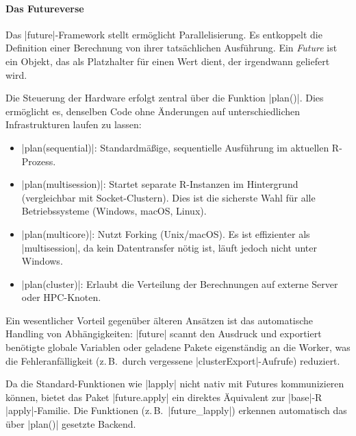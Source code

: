 \documentclass[10pt,twocolumn]{scrartcl}
\renewcommand{\lstinline}{\mycoloredinline}
\begin{document}
\paragraph{Das Futureverse}

Das \lstinline|future|-Framework stellt ermöglicht Parallelisierung. Es entkoppelt die Definition einer Berechnung von ihrer tatsächlichen Ausführung. Ein \emph{Future} ist ein Objekt, das als Platzhalter für einen Wert dient, der irgendwann geliefert wird.

Die Steuerung der Hardware erfolgt zentral über die Funktion \lstinline|plan()|. Dies ermöglicht es, denselben Code ohne Änderungen auf unterschiedlichen Infrastrukturen laufen zu lassen:

\begin{itemize}
\item \lstinline|plan(sequential)|: Standardmäßige, sequentielle Ausführung im aktuellen R-Prozess.
\item \lstinline|plan(multisession)|: Startet separate R-Instanzen im Hintergrund (vergleichbar mit Socket-Clustern). Dies ist die sicherste Wahl für alle Betriebssysteme (Windows, macOS, Linux).
\item \lstinline|plan(multicore)|: Nutzt Forking (Unix/macOS). Es ist effizienter als \lstinline|multisession|, da kein Datentransfer nötig ist, läuft jedoch nicht unter Windows.
\item \lstinline|plan(cluster)|: Erlaubt die Verteilung der Berechnungen auf externe Server oder HPC-Knoten.
\end{itemize}

Ein wesentlicher Vorteil gegenüber älteren Ansätzen ist das automatische Handling von Abhängigkeiten: \lstinline|future| scannt den Ausdruck und exportiert benötigte globale Variablen oder geladene Pakete eigenständig an die Worker, was die Fehleranfälligkeit (z.\,B.\ durch vergessene \lstinline|clusterExport|-Aufrufe) reduziert.

Da die Standard-Funktionen wie \lstinline|lapply| nicht nativ mit Futures kommunizieren können, bietet das Paket \lstinline|future.apply| ein direktes Äquivalent zur \lstinline|base|-R \lstinline|apply|-Familie. Die Funktionen (z.\,B.\ \lstinline|future_lapply|) erkennen automatisch das über \lstinline|plan()| gesetzte Backend.
\end{document}
